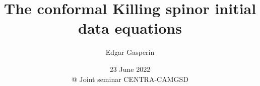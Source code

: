 \documentclass[10pt]{beamer}
\title[CKSID] %
{The conformal Killing spinor initial data equations
}
\author{Edgar Gasper\'in}
\institute[CENTRA-IST] %
{\alert{

\textcolor{black}{{\normalsize{
in collaboration with  Jarrod L. Williams   \\ \medskip
arXiv:1704.07586v2 [gr-qc]. To appear in Journal of Geometry and Physics  }}}\\ \medskip
{} \\
} \\
[1ex]
\href{mailto:edgar.gasperin@tecnico.ulisboa.pt}{\blue{edgar.gasperin@tecnico.ulisboa.pt}}}
\date[]
{23 June 2022\\
@ Joint seminar CENTRA-CAMGSD 
}
\theoremstyle{plain}
\begin{document}

\begin{frame}
  \titlepage
\end{frame}















\end{document}

